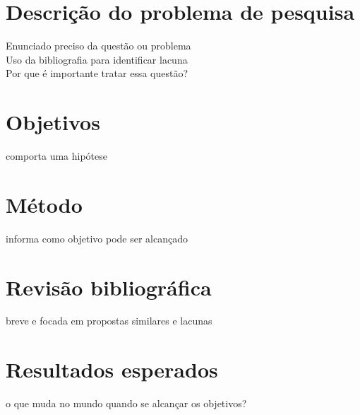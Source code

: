 \documentclass[12pt,				%
	openright,			%
	oneside,			%
	a4paper,			%
	english,			%
	brazil				%
	]{abntex2}
\begin{document}

\textual

\chapter{Descrição do problema de pesquisa} \label{chap:intro}
%
Enunciado preciso da questão ou problema \\
Uso da bibliografia para identificar lacuna \\
Por que é importante tratar essa questão?

\chapter{Objetivos} \label{chap:obj}
comporta uma hipótese

\chapter{Método} \label{chap:metodo}
informa como objetivo pode ser alcançado

\chapter{Revisão bibliográfica} \label{chap:related}
breve e focada em propostas similares e lacunas

\chapter{Resultados esperados} \label{chap:result}
o que muda no mundo quando se alcançar os objetivos?



\postextual

%  

\begin{comment}
\printindex
\end{comment}

\end{document}
